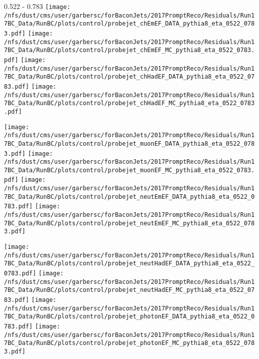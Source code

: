 \documentclass[t,compress]{beamer}
\begin{document}
\begin{frame}{0.522 - 0.783}
	\texttt{[image: /nfs/dust/cms/user/garbersc/forBaconJets/2017PromptReco/Residuals/Run17BC\_Data/RunBC/plots/control/probejet\_chEmEF\_DATA\_pythia8\_eta\_0522\_0783.pdf]}
	\texttt{[image: /nfs/dust/cms/user/garbersc/forBaconJets/2017PromptReco/Residuals/Run17BC\_Data/RunBC/plots/control/probejet\_chEmEF\_MC\_pythia8\_eta\_0522\_0783.pdf]}
	\texttt{[image: /nfs/dust/cms/user/garbersc/forBaconJets/2017PromptReco/Residuals/Run17BC\_Data/RunBC/plots/control/probejet\_chHadEF\_DATA\_pythia8\_eta\_0522\_0783.pdf]}
	\texttt{[image: /nfs/dust/cms/user/garbersc/forBaconJets/2017PromptReco/Residuals/Run17BC\_Data/RunBC/plots/control/probejet\_chHadEF\_MC\_pythia8\_eta\_0522\_0783.pdf]}
\newline

\vspace{-0.65cm}
	\texttt{[image: /nfs/dust/cms/user/garbersc/forBaconJets/2017PromptReco/Residuals/Run17BC\_Data/RunBC/plots/control/probejet\_muonEF\_DATA\_pythia8\_eta\_0522\_0783.pdf]}
	\texttt{[image: /nfs/dust/cms/user/garbersc/forBaconJets/2017PromptReco/Residuals/Run17BC\_Data/RunBC/plots/control/probejet\_muonEF\_MC\_pythia8\_eta\_0522\_0783.pdf]}
	\texttt{[image: /nfs/dust/cms/user/garbersc/forBaconJets/2017PromptReco/Residuals/Run17BC\_Data/RunBC/plots/control/probejet\_neutEmEF\_DATA\_pythia8\_eta\_0522\_0783.pdf]}
	\texttt{[image: /nfs/dust/cms/user/garbersc/forBaconJets/2017PromptReco/Residuals/Run17BC\_Data/RunBC/plots/control/probejet\_neutEmEF\_MC\_pythia8\_eta\_0522\_0783.pdf]}
\newline

\vspace{-0.65cm}
	\texttt{[image: /nfs/dust/cms/user/garbersc/forBaconJets/2017PromptReco/Residuals/Run17BC\_Data/RunBC/plots/control/probejet\_neutHadEF\_DATA\_pythia8\_eta\_0522\_0783.pdf]}
	\texttt{[image: /nfs/dust/cms/user/garbersc/forBaconJets/2017PromptReco/Residuals/Run17BC\_Data/RunBC/plots/control/probejet\_neutHadEF\_MC\_pythia8\_eta\_0522\_0783.pdf]}
	\texttt{[image: /nfs/dust/cms/user/garbersc/forBaconJets/2017PromptReco/Residuals/Run17BC\_Data/RunBC/plots/control/probejet\_photonEF\_DATA\_pythia8\_eta\_0522\_0783.pdf]}
	\texttt{[image: /nfs/dust/cms/user/garbersc/forBaconJets/2017PromptReco/Residuals/Run17BC\_Data/RunBC/plots/control/probejet\_photonEF\_MC\_pythia8\_eta\_0522\_0783.pdf]}
\end{frame}
\end{document}
